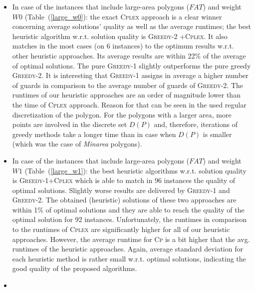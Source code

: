 \documentclass[runningheads,a4paper]{elsarticle}
\begin{document}
\begin{itemize}
     	\item In case of the instances that include large-area polygons ($FAT$) and weight $W0$ (Table~(\ref{large_w0}): the exact \textsc{Cplex} approach is a clear winner concerning average solutions' quality as well as the average runtimes;  the best heuristic algorithm w.r.t. solution quality is \textsc{Greedy-2 +Cplex}. It also matches in the most cases (on 6 instances) to the optimum results w.r.t. other heuristic approaches. Its average results are within 22\% of the average of  optimal solutions.  The pure \textsc{Greedy-1} slightly outperforms the pure greedy \textsc{Greedy-2}. It is interesting that \textsc{Greedy-1} assigns in average a  higher number of guards in comparison to the average number of guards of \textsc{Greedy-2}. The runtimes of our heuristic approaches are an order of magnitude lower than the time of \textsc{Cplex} approach. Reason for that can be seen in the used regular discretization of the polygon. For the polygons with a larger area, more points are involved in the discrete set $D(P)$ and, therefore, iterations of greedy methods take a longer time than in case when $D(P)$ is smaller (which was the case of \emph{Minarea} polygons).
     	\item  In case of the instances that include large-area polygons ($FAT$) and weight $W1$ (Table~(\ref{large_w1}): the best heuristic algorithms w.r.t. solution quality is \textsc{Greedy-1+Cplex} which is able to match in 96 instances the quality of optimal solutions. Slightly worse results are delivered by \textsc{Greedy-1} and \textsc{Greedy-2}. The obtained (heuristic) solutions of these two approaches are within 1\% of optimal solutions and they are
     	able to reach the quality of the optimal solution for 92 instances. Unfortunately, the runtimes in comparison to the runtimes of \textsc{Cplex} are significantly higher for all of our heuristic approaches. However, the average runtime for \textsc{Cp} is a bit higher that the avg. runtimes of the heuristic approaches. Again, average standard deviation for each heuristic method is rather small w.r.t. optimal solutions, indicating the good quality of the proposed algorithms.
     	\item {}
     \end{itemize}
    
\end{document}

